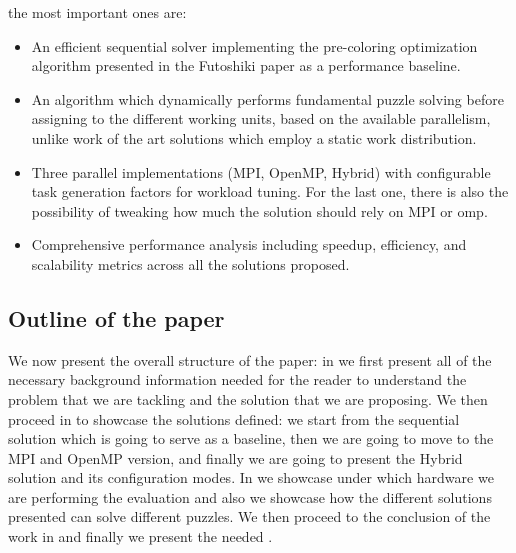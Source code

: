the most important ones are:
\begin{itemize}
    \item An efficient sequential solver implementing the pre-coloring optimization algorithm presented in the Futoshiki paper as a performance baseline.
    \item An algorithm which dynamically performs fundamental puzzle solving before assigning to the different working units, based on the available parallelism, unlike work of the art solutions which employ a static work distribution.
    \item Three parallel implementations (MPI, OpenMP, Hybrid) with configurable task generation factors for workload tuning. For the last one, there is also the possibility of tweaking how much the solution should rely on MPI or omp.
    \item Comprehensive performance analysis including speedup, efficiency, and scalability metrics across all the solutions proposed.
\end{itemize}


\subsection{Outline of the paper}
We now present the overall structure of the paper: in  we first present all of the necessary background information needed for the reader to understand the problem that we are tackling and the solution that we are proposing. We then proceed in  to showcase the solutions defined: we start from the sequential solution which is going to serve as a baseline, then we are going to move to the MPI and OpenMP version, and finally we are going to present the Hybrid solution and its configuration modes. In  we showcase under which hardware we are performing the evaluation and also we showcase how the different solutions presented can solve different puzzles. We then proceed to the conclusion of the work in  and finally we present the needed .